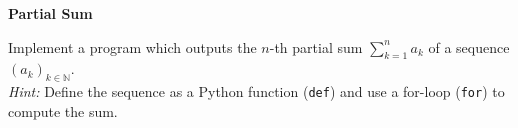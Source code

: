 \textbf{Partial Sum}

Implement a program which outputs the $n$-th partial sum $\sum_{k=1}^n a_k$ of a sequence ${(a_k)}_{k\in\mathbb{N}}$.\\
\textit{Hint:} Define the sequence as a Python function (\verb|def|) and use a for-loop (\verb|for|) to compute the sum.
